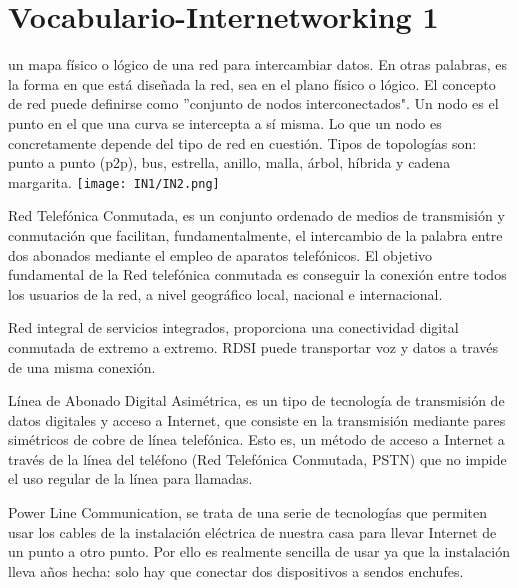 \documentclass[
	12pt, %
	fleqn, %
	a4paper, %
]{LegrandOrangeBook}
\begin{document}
\section*{Vocabulario-Internetworking 1}
\begin{vocabulary}
un mapa físico o lógico de una red para intercambiar datos. En otras palabras, es la forma en que está diseñada la red, sea en el plano físico o lógico. El concepto de red puede definirse como ''conjunto de nodos interconectados". Un nodo es el punto en el que una curva se intercepta a sí misma. Lo que un nodo es concretamente depende del tipo de red en cuestión. Tipos de topologías son: punto a punto (p2p), bus, estrella, anillo, malla, árbol, híbrida y cadena margarita.
\texttt{[image: IN1/IN2.png]}
\end{vocabulary}
\begin{vocabulary}[RTC]
Red Telefónica Conmutada, es un conjunto ordenado de medios de transmisión y conmutación que facilitan, fundamentalmente, el intercambio de la palabra entre dos abonados mediante el empleo de aparatos telefónicos. El objetivo fundamental de la Red telefónica conmutada es conseguir la conexión entre todos los usuarios de la red, a nivel geográfico local, nacional e internacional.
\end{vocabulary}
\begin{vocabulary}[RDSI]
Red integral de servicios integrados, proporciona una conectividad digital conmutada de extremo a extremo. RDSI puede transportar voz y datos a través de una misma conexión.
\end{vocabulary}
\begin{vocabulary}[ADSL]
Línea de Abonado Digital Asimétrica, es un tipo de tecnología de transmisión de datos digitales y acceso a Internet, que consiste en la transmisión mediante pares simétricos de cobre de línea telefónica. Esto es, un método de acceso a Internet a través de la línea del teléfono (Red Telefónica Conmutada, PSTN) que no impide el uso regular de la línea para llamadas.
\end{vocabulary}
\begin{vocabulary}[PLC]
Power Line Communication, se trata de una serie de tecnologías que permiten usar los cables de la instalación eléctrica de nuestra casa para llevar Internet de un punto a otro punto. Por ello es realmente sencilla de usar ya que la instalación lleva años hecha: solo hay que conectar dos dispositivos a sendos enchufes.
\end{vocabulary}
\end{document}
